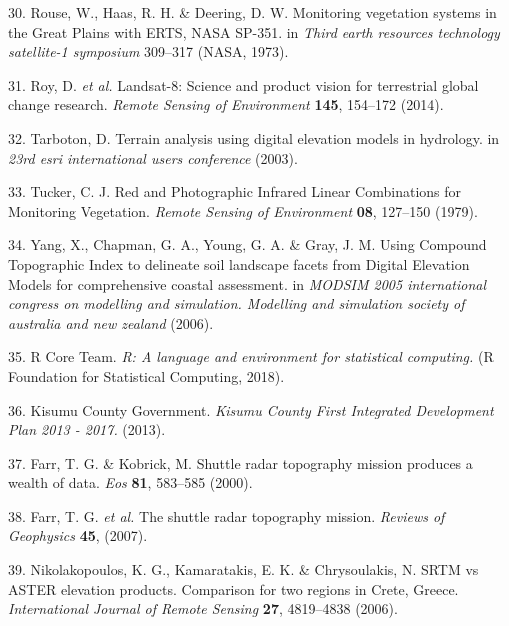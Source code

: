 \documentclass[12pt,oneside]{article}
\begin{document}
\leavevmode\hypertarget{ref-Rouse_et_al_1973}{}%
30. Rouse, W., Haas, R. H. \& Deering, D. W. Monitoring vegetation
systems in the Great Plains with ERTS, NASA SP-351. in \emph{Third earth
resources technology satellite-1 symposium} 309--317 (NASA, 1973).

\leavevmode\hypertarget{ref-Roy_et_al_2014}{}%
31. Roy, D. \emph{et al.} Landsat-8: Science and product vision for
terrestrial global change research. \emph{Remote Sensing of Environment}
\textbf{145}, 154--172 (2014).

\leavevmode\hypertarget{ref-Tarboton_2003}{}%
32. Tarboton, D. Terrain analysis using digital elevation models in
hydrology. in \emph{23rd esri international users conference} (2003).

\leavevmode\hypertarget{ref-Tucker_1979}{}%
33. Tucker, C. J. Red and Photographic Infrared Linear Combinations for
Monitoring Vegetation. \emph{Remote Sensing of Environment} \textbf{08},
127--150 (1979).

\leavevmode\hypertarget{ref-Yang_et_al_2006}{}%
34. Yang, X., Chapman, G. A., Young, G. A. \& Gray, J. M. Using Compound
Topographic Index to delineate soil landscape facets from Digital
Elevation Models for comprehensive coastal assessment. in \emph{MODSIM
2005 international congress on modelling and simulation. Modelling and
simulation society of australia and new zealand} (2006).

\leavevmode\hypertarget{ref-RCoreTeam_2018}{}%
35. R Core Team. \emph{R: A language and environment for statistical
computing.} (R Foundation for Statistical Computing, 2018).

\leavevmode\hypertarget{ref-KisumuCountyGovernment_2013}{}%
36. Kisumu County Government. \emph{Kisumu County First Integrated
Development Plan 2013 - 2017.} (2013).

\leavevmode\hypertarget{ref-Farr_et_al_2000}{}%
37. Farr, T. G. \& Kobrick, M. Shuttle radar topography mission produces
a wealth of data. \emph{Eos} \textbf{81}, 583--585 (2000).

\leavevmode\hypertarget{ref-Farr_et_al_2007}{}%
38. Farr, T. G. \emph{et al.} The shuttle radar topography mission.
\emph{Reviews of Geophysics} \textbf{45}, (2007).

\leavevmode\hypertarget{ref-Nikolakopoulos_et_al_2006}{}%
39. Nikolakopoulos, K. G., Kamaratakis, E. K. \& Chrysoulakis, N. SRTM
vs ASTER elevation products. Comparison for two regions in Crete,
Greece. \emph{International Journal of Remote Sensing} \textbf{27},
4819--4838 (2006).
\end{document}
